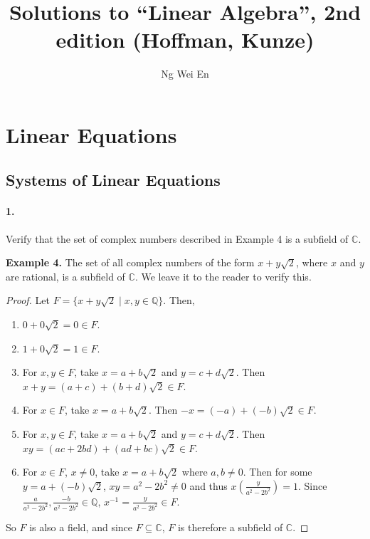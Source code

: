 \documentclass{article}
\title{Solutions to ``Linear Algebra'', 2nd edition (Hoffman, Kunze)}
\author{Ng Wei En}
\begin{document}
\maketitle
\tableofcontents
\newpage

\section{Linear Equations}

\setcounter{subsection}{1}
\subsection{Systems of Linear Equations}

\paragraph{1.} Verify that the set of complex numbers described in Example 4 is
a subfield of $\mathbb{C}$.

\begin{displayquote}
  \textbf{Example 4.} The set of all complex numbers of the form $x +
  y\sqrt{2}$, where $x$ and $y$ are rational, is a subfield of $\mathbb{C}$. We
  leave it to the reader to verify this.
\end{displayquote}

\begin{proof}
  Let $F = \{x + y\sqrt{2} \mid x, y \in \mathbb{Q}\}$. Then,
  \begin{enumerate}
    \item $0 + 0\sqrt{2} = 0 \in F$.
    \item $1 + 0\sqrt{2} = 1 \in F$.
    \item For $x, y \in F$, take $x = a + b\sqrt{2}$ and $y = c + d\sqrt{2}$.
      Then $x + y = (a + c) + (b + d)\sqrt{2} \in F$.
    \item For $x \in F$, take $x = a + b\sqrt{2}$. Then $-x = (-a) +
      (-b)\sqrt{2} \in F$.
    \item For $x, y \in F$, take $x = a + b\sqrt{2}$ and $y = c + d\sqrt{2}$.
      Then $xy = (ac + 2bd) + (ad + bc)\sqrt{2} \in F$.
    \item For $x \in F$, $x \neq 0$, take $x = a + b\sqrt{2}$ where $a, b \neq
      0$. Then for some $y = a + (-b)\sqrt{2}$, $xy = a^2 - 2b^2 \neq 0$ and
      thus $x\left(\frac{y}{a^2 - 2b^2}\right) = 1$. Since
      $\frac{a}{a^2 - 2b^2}, \frac{-b}{a^2 - 2b^2} \in \mathbb{Q}$, $x^{-1} =
      \frac{y}{a^2 - 2b^2} \in F$.
  \end{enumerate}
  So $F$ is also a field, and since $F \subseteq \mathbb{C}$, $F$ is therefore a
  subfield of $\mathbb{C}$.
\end{proof}
\end{document}
